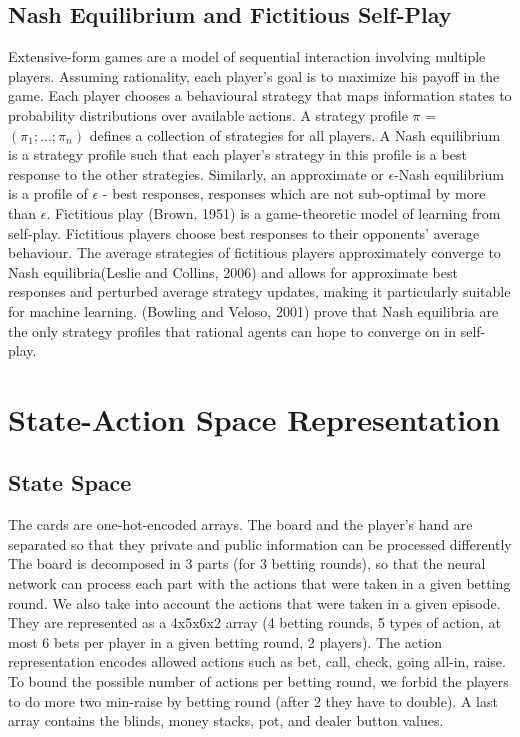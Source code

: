 \documentclass{article}
\begin{document}
\subsection{Nash Equilibrium and Fictitious Self-Play}
Extensive-form games are a model of sequential interaction involving multiple players. Assuming
rationality, each player’s goal is to maximize his payoff in the game. Each player chooses a behavioural
strategy that maps information states to probability distributions over available actions. A strategy profile $\pi$ = $(\pi_1;... ; \pi_n)$ defines a collection of strategies for all players. A Nash equilibrium is a strategy profile such that each player’s strategy in this profile is a best response to the other strategies. Similarly, an approximate or $\epsilon$-Nash equilibrium is a profile of $\epsilon$ - best responses, responses which are not sub-optimal by more than $\epsilon$. Fictitious play (Brown, 1951) is a game-theoretic model of learning from self-play. Fictitious players choose best responses to their opponents’ average behaviour. The average strategies of fictitious players approximately converge to Nash equilibria(Leslie and Collins, 2006) and allows for approximate best responses and perturbed average strategy updates, making it particularly suitable for machine learning. (Bowling and Veloso, 2001) prove that Nash equilibria are the only strategy profiles that rational agents can hope to converge on in self-play. 
\section{State-Action Space Representation}
\subsection{State Space}
The cards are one-hot-encoded arrays. The board and the player's hand are separated so that they private and public information can be processed differently The board is decomposed in 3 parts (for 3 betting rounds), so that the neural network can process each part with the actions that were taken in
a given betting round. We also take into account the actions that were taken in a given episode. They are represented as a 4x5x6x2 array (4 betting rounds, 5 types of action, at most 6 bets per player in a given betting round, 2 players).  The action representation encodes allowed actions such as bet, call, check, going all-in, raise. To bound the possible number of actions per betting round, we forbid the players to do more two min-raise by betting round (after 2 they have to double). A last array contains the blinds, money stacks, pot, and dealer button values.
\end{document}

